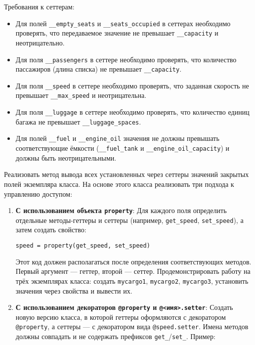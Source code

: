 \begin{enumerate}
\begin{itemize}
\end{itemize}
Требования к сеттерам:
\begin{itemize}
    \item Для полей \texttt{\_\_empty\_seats} и \texttt{\_\_seats\_occupied} в сеттерах необходимо проверять, что передаваемое значение не превышает \texttt{\_\_capacity} и неотрицательно.  
    \item Для поля \texttt{\_\_passengers} в сеттере необходимо проверять, что количество пассажиров (длина списка) не превышает \texttt{\_\_capacity}.  
    \item Для поля \texttt{\_\_speed} в сеттере необходимо проверять, что заданная скорость не превышает \texttt{\_\_max\_speed} и неотрицательна.  
    \item Для поля \texttt{\_\_luggage} в сеттере необходимо проверять, что количество единиц багажа не превышает \texttt{\_\_luggage\_spaces}.
    \item Для полей \texttt{\_\_fuel} и \texttt{\_\_engine\_oil} значения не должны превышать соответствующие ёмкости (\texttt{\_\_fuel\_tank} и \texttt{\_\_engine\_oil\_capacity}) и должны быть неотрицательными.
\end{itemize}
Реализовать метод вывода всех установленных через сеттеры значений закрытых полей экземпляра класса.
На основе этого класса реализовать три подхода к управлению доступом:
\begin{enumerate}
    \item \textbf{С использованием объекта \texttt{property}}:  
    Для каждого поля определить отдельные методы-геттеры и сеттеры (например, \texttt{get\_speed}, \texttt{set\_speed}), а затем создать свойство:  
    \begin{verbatim}
speed = property(get_speed, set_speed)
    \end{verbatim}  
    Этот код должен располагаться после определения соответствующих методов. Первый аргумент — геттер, второй — сеттер.  
    Продемонстрировать работу на трёх экземплярах класса: создать \texttt{mycargo1}, \texttt{mycargo2}, \texttt{mycargo3}, установить значения через свойства и вывести их.
    \item \textbf{С использованием декораторов \texttt{@property} и \texttt{@<имя>.setter}}:  
    Создать новую версию класса, в которой геттеры оформляются с декоратором \texttt{@property}, а сеттеры — с декоратором вида \texttt{@speed.setter}. Имена методов должны совпадать и не содержать префиксов \texttt{get\_}/\texttt{set\_}.  
    Пример:  
    \begin{verbatim}

\end{verbatim}
\end{enumerate}
\end{enumerate}
